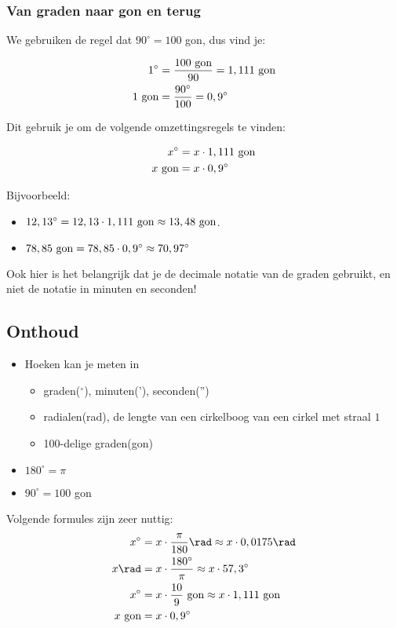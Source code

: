 \documentclass[a4paper,12pt]{article}
\begin{document}
\subsubsection{Van graden naar gon en terug}

We gebruiken de regel dat $90^\circ=100$ gon, dus vind je:
\begin{framed}
\begin{align*}
1^\circ &= \frac{100 \textup{ gon}}{90}= 1,111 \textup{ gon}\\
1 \textup{ gon} &= \frac{90^\circ}{100} = 0,9^\circ
\end{align*}
\end{framed}
Dit gebruik je om de volgende omzettingsregels te vinden:
\begin{framed}
\begin{align*}
x^\circ &= x\cdot 1,111 \textup{ gon}\\
x \textup{ gon} &= x\cdot 0,9^\circ
\end{align*}
\end{framed}
Bijvoorbeeld:
\begin{itemize}
	\item $12,13^\circ = 12,13 \cdot 1,111 \textup{ gon} \approx 13,48 \textup{ gon}$.
	\item $78,85 \textup{ gon} = 78,85 \cdot 0,9^\circ \approx 70,97^\circ$
\end{itemize}

Ook hier is het belangrijk dat je de decimale notatie van de graden gebruikt, en niet de notatie in minuten en seconden!

\subsection{Onthoud}
\begin{framed}
\begin{itemize}
	\item Hoeken kan je meten in
	
\begin{itemize}
	\item graden($^\circ$), minuten('), seconden('')
	\item radialen(rad), de lengte van een cirkelboog van een cirkel met straal $1$
	\item 100-delige graden(gon)
\end{itemize}
\item $180^\circ=\pi$
\item $90^\circ=100$ gon
\end{itemize}

Volgende formules zijn zeer nuttig:
\begin{align*}
x^\circ &= x\cdot \frac{\pi}{180} \rad \approx x\cdot 0,0175 \rad\\
x \rad &= x \cdot \frac{180^\circ}{\pi} \approx x \cdot 57,3^\circ\\
x^\circ &= x \cdot \frac{10}{9} \textup{ gon} \approx x \cdot 1,111 \textup{ gon}\\
x \textup{ gon} &= x\cdot 0,9^\circ
\end{align*}
\end{framed}
\end{document}
